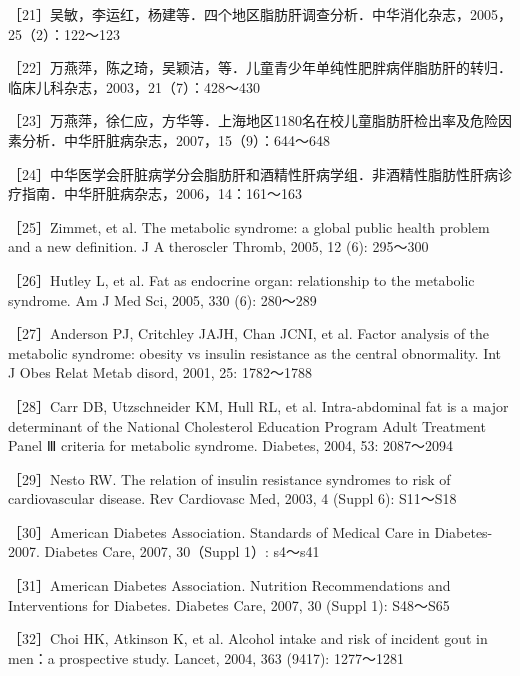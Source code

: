 ［21］吴敏，李运红，杨建等．四个地区脂肪肝调查分析．中华消化杂志，2005，25（2）：122～123

［22］万燕萍，陈之琦，吴颖洁，等．儿童青少年单纯性肥胖病伴脂肪肝的转归．临床儿科杂志，2003，21（7）：428～430

［23］万燕萍，徐仁应，方华等．上海地区1180名在校儿童脂肪肝检出率及危险因素分析．中华肝脏病杂志，2007，15（9）：644～648

［24］中华医学会肝脏病学分会脂肪肝和酒精性肝病学组．非酒精性脂肪性肝病诊疗指南．中华肝脏病杂志，2006，14：161～163

［25］Zimmet, et al. The metabolic syndrome: a global public health
problem and a new definition. J A theroscler Thromb, 2005, 12 (6):
295～300

［26］Hutley L, et al. Fat as endocrine organ: relationship to the
metabolic syndrome. Am J Med Sci, 2005, 330 (6): 280～289

［27］Anderson PJ, Critchley JAJH, Chan JCNI, et al. Factor analysis of
the metabolic syndrome: obesity vs insulin resistance as the central
obnormality. Int J Obes Relat Metab disord, 2001, 25: 1782～1788

［28］Carr DB, Utzschneider KM, Hull RL, et al. Intra-abdominal fat is a
major determinant of the National Cholesterol Education Program Adult
Treatment Panel Ⅲ criteria for metabolic syndrome. Diabetes, 2004, 53:
2087～2094

［29］Nesto RW. The relation of insulin resistance syndromes to risk of
cardiovascular disease. Rev Cardiovasc Med, 2003, 4 (Suppl 6): S11～S18

［30］American Diabetes Association. Standards of Medical Care in
Diabetes-2007. Diabetes Care, 2007, 30（Suppl 1）: s4～s41

［31］American Diabetes Association. Nutrition Recommendations and
Interventions for Diabetes. Diabetes Care, 2007, 30 (Suppl 1): S48～S65

［32］Choi HK, Atkinson K, et al. Alcohol intake and risk of incident
gout in men：a prospective study. Lancet, 2004, 363 (9417): 1277～1281

\protect\hypertarget{text00005.html}{}{}

